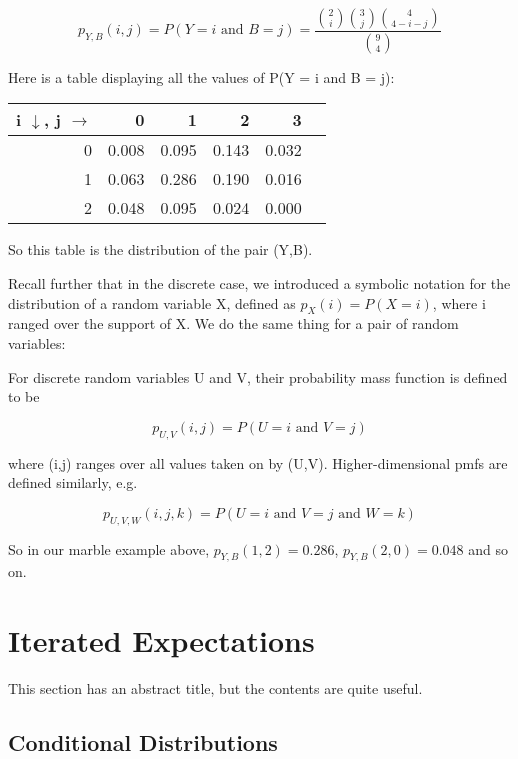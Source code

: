 \begin{equation}
p_{Y,B}(i,j) = P(Y = i \textrm{ and } B = j) = 
\frac
{
\binom{2}{i}
\binom{3}{j}
\binom{4}{4-i-j}
}
{\binom{9}{4}}
\end{equation}

Here is a table displaying all the values of P(Y = i and B = j):

\begin{tabular}{|r|r|r|r|r|r|}
\hline
i $\downarrow$, j $\rightarrow$ & 0 & 1 & 2 & 3 \\ \hline
0 & 0.008 & 0.095 & 0.143 & 0.032 \\ \hline
1 & 0.063 & 0.286 & 0.190 & 0.016 \\ \hline
2 & 0.048 & 0.095 & 0.024 & 0.000 \\ \hline
\end{tabular}

So this table is the distribution of the pair (Y,B).

Recall further that in the discrete case, we introduced a symbolic
notation for the distribution of a random variable X, defined as
$p_X(i) = P(X = i)$, where i ranged over the support of X.
We do the same thing for a pair of random variables:

\begin{definition}
For discrete random variables U and V, their
probability mass function is defined to be

\begin{equation}
p_{U,V}(i,j) = P(U = i \textrm{ and } V = j)
\end{equation}

where (i,j) ranges over all values taken on by (U,V).
Higher-dimensional pmfs are defined similarly, e.g.

\begin{equation}
p_{U,V,W}(i,j,k) = P(U = i \textrm{ and } V = j \textrm{ and } W = k)
\end{equation}
\end{definition}

So in our marble example above, $p_{Y,B}(1,2) = 0.286$, $p_{Y,B}(2,0) =
0.048$ and so on.

\section{Iterated Expectations}
\label{iterexp}

This section has an abstract title, but the contents are quite useful.

\subsection{Conditional Distributions}

